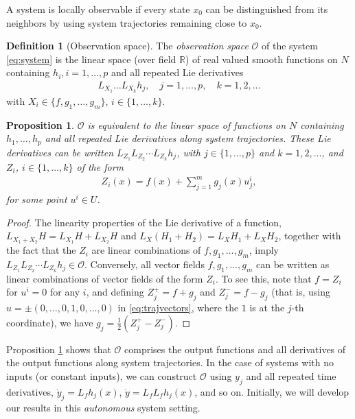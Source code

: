 \documentclass[psamsfonts]{amsart}
\newtheorem{prop}[thm]{Proposition}
\theoremstyle{definition}
\newtheorem{defn}[thm]{Definition}
\theoremstyle{remark}
\newcommand*\R{\mathds{R}}
\numberwithin{equation}{section}
\begin{document}
A system is locally observable if every state $x_0$ can be distinguished from its neighbors by using system trajectories remaining close to $x_0$. 

\begin{defn}[Observation space]
    The \textit{observation space} $\mathscr{O}$ of the system \eqref{eq:system} is the linear space (over field $\R$) of real valued smooth functions on $N$ containing $h_i, i = 1, \dots, p$ and all repeated Lie derivatives 
    \begin{align}
        L_{X_1}\dots L_{X_k}h_j, \quad j = 1,\dots, p, \quad k = 1,2, \dots
    \end{align}
    with $X_i \in \{f, g_1, \dots, g_m\}$, $i\in\{1, \dots, k\}$. 
\end{defn}

\begin{prop}\label{prop:O-space-equiv}
$\mathscr{O}$ is equivalent to the linear space of functions on $N$ containing $h_1, \dots, h_p$ and all repeated Lie derivatives along system trajectories. These Lie derivatives can be written $L_{Z_1}L_{Z_2}\cdots L_{Z_k}h_j$, with $j \in \{1, \dots, p\}$ and $k=1, 2, \dots$, and $Z_i$, $i\in \{1, \dots, k\}$ of the form
\begin{align}\label{eq:trajvectors}
Z_i(x) = f(x) + \sum_{j = 1}^{m}g_j(x)u_j^i,
\end{align} 
for some point $u^i \in U$. 
\end{prop}
\begin{proof}
The linearity properties of the Lie derivative of a function, $L_{X_1+X_2}H = L_{X_1}H+L_{X_2}H$ and $L_X(H_1+H_2) = L_XH_1 + L_XH_2$, together with the fact that the $Z_i$ are linear combinations of $f, g_1, \dots, g_m$, imply $L_{Z_1}L_{Z_2}\cdots L_{Z_k}h_j \in \mathscr{O}$. Conversely, all vector fields $f, g_1, \dots, g_m$ can be written as linear combinations of vector fields of the form $Z_i$. To see this, note that $f = Z_i$ for $u^i = 0$ for any $i$, and defining $Z_{j}^{+} = f+g_j$ and $Z_{j}^{-} = f-g_j$ (that is, using $u = \pm (0, \dots, 0, 1, 0, \dots, 0)$ in \eqref{eq:trajvectors}, where the $1$ is at the $j$-th coordinate), we have $g_j = \frac{1}{2}(Z_{j}^{+}-Z_{j}^{-})$.  
\end{proof}

Proposition \ref{prop:O-space-equiv} shows that $\mathscr{O}$ comprises the output functions and all derivatives of the output functions along system trajectories. In the case of systems with no inputs (or constant inputs), we can construct $\mathscr{O}$ using $y_j$ and all repeated time derivatives, $\dot y_j = L_fh_j(x)$, $\ddot y = L_fL_fh_j(x)$, and so on. Initially, we will develop our results in this \textit{autonomous} system setting. 
\end{document}
